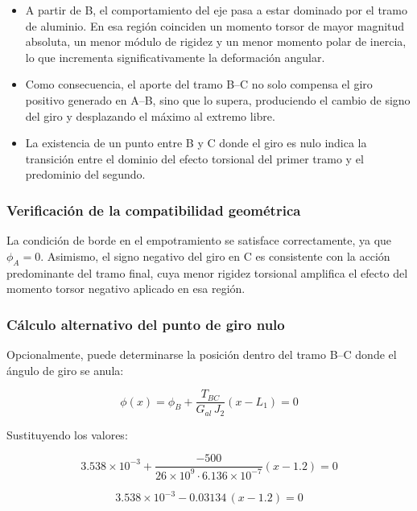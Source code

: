 \documentclass[12pt,a4paper]{article}
\begin{document}
\begin{enumerate}
\begin{itemize}
    \item A partir de B, el comportamiento del eje pasa a estar dominado por el tramo de aluminio. En esa región coinciden un momento torsor de mayor magnitud absoluta, un menor módulo de rigidez y un menor momento polar de inercia, lo que incrementa significativamente la deformación angular.
    
    \item Como consecuencia, el aporte del tramo B--C no solo compensa el giro positivo generado en A--B, sino que lo supera, produciendo el cambio de signo del giro y desplazando el máximo al extremo libre.
    
    \item La existencia de un punto entre B y C donde el giro es nulo indica la transición entre el dominio del efecto torsional del primer tramo y el predominio del segundo.
\end{itemize}

\subsubsection*{Verificación de la compatibilidad geométrica}

La condición de borde en el empotramiento se satisface correctamente, ya que $\phi_A = 0$. Asimismo, el signo negativo del giro en C es consistente con la acción predominante del tramo final, cuya menor rigidez torsional amplifica el efecto del momento torsor negativo aplicado en esa región.

\subsubsection*{Cálculo alternativo del punto de giro nulo}

Opcionalmente, puede determinarse la posición dentro del tramo B--C donde el ángulo de giro se anula:

\begin{equation}
\phi(x)=\phi_B+\frac{T_{BC}}{G_{al}\,J_2}(x-L_1)=0
\end{equation}

Sustituyendo los valores:

\begin{equation}
3.538\times 10^{-3}
+\frac{-500}{26\times 10^9 \cdot 6.136\times 10^{-7}}(x-1.2)=0
\end{equation}

\begin{equation}
3.538\times 10^{-3}-0.03134\,(x-1.2)=0
\end{equation}


\end{enumerate}
\end{document}
